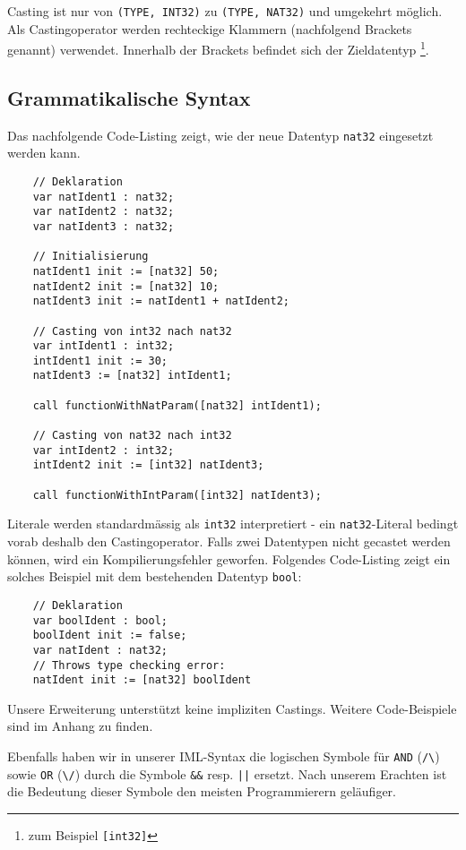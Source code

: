 \documentclass[10pt, a4paper, twocolumn]{article} %
\begin{document}
Casting ist nur von \texttt{(TYPE, INT32)} zu \texttt{(TYPE, NAT32)} und umgekehrt möglich.
Als Castingoperator werden rechteckige Klammern (nachfolgend Brackets genannt) verwendet.
Innerhalb der Brackets befindet sich der Zieldatentyp \footnote{zum Beispiel \texttt{[int32]}}.

\subsection{Grammatikalische Syntax}
Das nachfolgende Code-Listing zeigt, wie der neue Datentyp \texttt{nat32} eingesetzt werden kann.
\begin{lstlisting}
    // Deklaration
    var natIdent1 : nat32;
    var natIdent2 : nat32;
    var natIdent3 : nat32;

    // Initialisierung
    natIdent1 init := [nat32] 50;
    natIdent2 init := [nat32] 10;
    natIdent3 init := natIdent1 + natIdent2;

    // Casting von int32 nach nat32
    var intIdent1 : int32;
    intIdent1 init := 30;
    natIdent3 := [nat32] intIdent1;

    call functionWithNatParam([nat32] intIdent1);

    // Casting von nat32 nach int32
    var intIdent2 : int32;
    intIdent2 init := [int32] natIdent3;

    call functionWithIntParam([int32] natIdent3);
\end{lstlisting}
Literale werden standardmässig als \texttt{int32} interpretiert - ein \texttt{nat32}-Literal bedingt vorab deshalb den Castingoperator.
Falls zwei Datentypen nicht gecastet werden können, wird ein Kompilierungsfehler geworfen.
Folgendes Code-Listing zeigt ein solches Beispiel mit dem bestehenden Datentyp \texttt{bool}:
\begin{lstlisting}
    // Deklaration
    var boolIdent : bool;
    boolIdent init := false;
    var natIdent : nat32;
    // Throws type checking error:
    natIdent init := [nat32] boolIdent
\end{lstlisting}
Unsere Erweiterung unterstützt keine impliziten Castings.
Weitere Code-Beispiele sind im Anhang zu finden.

Ebenfalls haben wir in unserer IML-Syntax die logischen Symbole für \texttt{AND} (\texttt{/\textbackslash{}}) sowie \texttt{OR} (\texttt{\textbackslash{}/}) durch die Symbole \texttt{\&\&} resp. \texttt{||} ersetzt.
Nach unserem Erachten ist die Bedeutung dieser Symbole den meisten Programmierern geläufiger.
\end{document}
